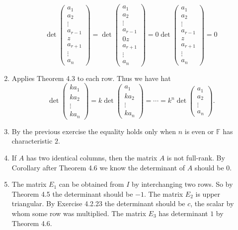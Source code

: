 \begin{enumerate}
\[\det\begin{pmatrix}a_1\\a_2\\\vdots\\a_{r-1}\\z\\a_{r+1}\\\vdots\\a_n\end{pmatrix}=\det\begin{pmatrix}a_1\\a_2\\\vdots\\a_{r-1}\\0z\\a_{r+1}\\\vdots\\a_n\end{pmatrix}=0\det\begin{pmatrix}a_1\\a_2\\\vdots\\a_{r-1}\\z\\a_{r+1}\\\vdots\\a_n\end{pmatrix}=0\]
\item Applies Theorem 4.3 to each row. Thus we have hat 
\[\det\begin{pmatrix}ka_1\\ka_2\\\vdots\\ka_n\end{pmatrix}=k\det\begin{pmatrix}a_1\\ka_2\\\vdots\\ka_n\end{pmatrix}=\cdots =k^n\det\begin{pmatrix}a_1\\a_2\\\vdots\\a_n\end{pmatrix}.\]
\item By the previous exercise the equality holds only when $n$ is even or $\mathbb{F}$ has characteristic $2$.
\item If $A$ has two identical columns, then the matrix $A$ is not full-rank. By Corollary after Theorem 4.6 we know the determinant of $A$ should be $0$.
\item The matrix $E_1$ can be obtained from $I$ by interchanging two rows. So by Theorem 4.5 the determinant should be $-1$. The matrix $E_2$ is upper triangular. By Exercise 4.2.23 the determinant should be $c$, the scalar by whom some row was multiplied. The matrix $E_3$ has determinant $1$ by Theorem 4.6.

\end{enumerate}
